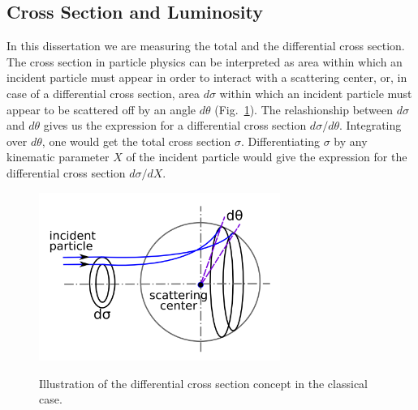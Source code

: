 \subsection{Cross Section and Luminosity}
\label{sec:LumiAndCS}

In this dissertation we are measuring the total and the differential cross section. The cross section in particle physics can be interpreted as area within which an incident particle must appear in order to interact with a scattering center, or, in case of a differential cross section, area $d\sigma$ within which an incident particle must appear to be scattered off by an angle $d\theta$ (Fig.~\ref{fig:CSclassical}). The relashionship between $d\sigma$ and $d\theta$ gives us the expression for a differential cross section $d\sigma/d\theta$. Integrating over $d\theta$, one would get the total cross section $\sigma$. Differentiating $\sigma$ by any kinematic parameter $X$ of the incident particle would give the expression for the differential cross section $d\sigma/dX$.\\


\begin{figure}[htb]
  \begin{center}
    {\includegraphics[width=0.70\textwidth]{../figs/WgAbout/CSclassical.png}}
    \caption{Illustration of the differential cross section concept in the classical case.}
    \label{fig:CSclassical}
  \end{center}
\end{figure}

